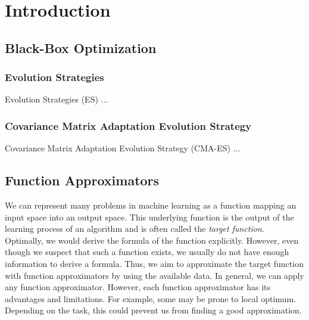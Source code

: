 
\chapter{Introduction}
\label{ch:introduction}

\section{Black-Box Optimization}
\subsection{Evolution Strategies}
Evolution Strategies (ES) ...

\subsection{Covariance Matrix Adaptation Evolution Strategy}
Covariance Matrix Adaptation Evolution Strategy (CMA-ES) ...

\section{Function Approximators}
We can represent many problems in machine learning as a function mapping an input space into an output space. This underlying function is the output of the learning process of an algorithm and is often called the \textit{target function}. Optimally, we would derive the formula of the function explicitly. However, even though we suspect that such a function exists, we usually do not have enough information to derive a formula. Thus, we aim to approximate the target function with function approximators by using the available data. In general, we can apply any function approximator. However, each function approximator has its advantages and limitations. For example, some may be prone to local optimum. Depending on the task, this could prevent us from finding a good approximation.

